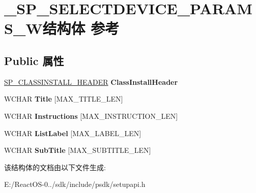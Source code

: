 \hypertarget{struct___s_p___s_e_l_e_c_t_d_e_v_i_c_e___p_a_r_a_m_s___w}{}\section{\+\_\+\+S\+P\+\_\+\+S\+E\+L\+E\+C\+T\+D\+E\+V\+I\+C\+E\+\_\+\+P\+A\+R\+A\+M\+S\+\_\+\+W结构体 参考}
\label{struct___s_p___s_e_l_e_c_t_d_e_v_i_c_e___p_a_r_a_m_s___w}
\subsection*{Public 属性}
\begin{DoxyCompactItemize}
\item 
\mbox{\label{struct___s_p___s_e_l_e_c_t_d_e_v_i_c_e___p_a_r_a_m_s___w_a8fa40b02d0ca97392bacf68a1a086c7d}} 
\hyperlink{struct___s_p___c_l_a_s_s_i_n_s_t_a_l_l___h_e_a_d_e_r}{S\+P\+\_\+\+C\+L\+A\+S\+S\+I\+N\+S\+T\+A\+L\+L\+\_\+\+H\+E\+A\+D\+ER} {\bfseries Class\+Install\+Header}
\item 
\mbox{\label{struct___s_p___s_e_l_e_c_t_d_e_v_i_c_e___p_a_r_a_m_s___w_ab4b6af3e46f0b5f27771a32e7c7fd6f0}} 
W\+C\+H\+AR {\bfseries Title} \mbox{[}M\+A\+X\+\_\+\+T\+I\+T\+L\+E\+\_\+\+L\+EN\mbox{]}
\item 
\mbox{\label{struct___s_p___s_e_l_e_c_t_d_e_v_i_c_e___p_a_r_a_m_s___w_abc7f490ee824fa4999f27a6dce7aa8d9}} 
W\+C\+H\+AR {\bfseries Instructions} \mbox{[}M\+A\+X\+\_\+\+I\+N\+S\+T\+R\+U\+C\+T\+I\+O\+N\+\_\+\+L\+EN\mbox{]}
\item 
\mbox{\label{struct___s_p___s_e_l_e_c_t_d_e_v_i_c_e___p_a_r_a_m_s___w_a0fe94492ab41d210275020e617061667}} 
W\+C\+H\+AR {\bfseries List\+Label} \mbox{[}M\+A\+X\+\_\+\+L\+A\+B\+E\+L\+\_\+\+L\+EN\mbox{]}
\item 
\mbox{\label{struct___s_p___s_e_l_e_c_t_d_e_v_i_c_e___p_a_r_a_m_s___w_a82ae4fbf8d6d6ce85440cd2f7b299deb}} 
W\+C\+H\+AR {\bfseries Sub\+Title} \mbox{[}M\+A\+X\+\_\+\+S\+U\+B\+T\+I\+T\+L\+E\+\_\+\+L\+EN\mbox{]}
\end{DoxyCompactItemize}


该结构体的文档由以下文件生成\+:\begin{DoxyCompactItemize}
\item 
E\+:/\+React\+O\+S-\/0../sdk/include/psdk/setupapi.\+h\end{DoxyCompactItemize}
